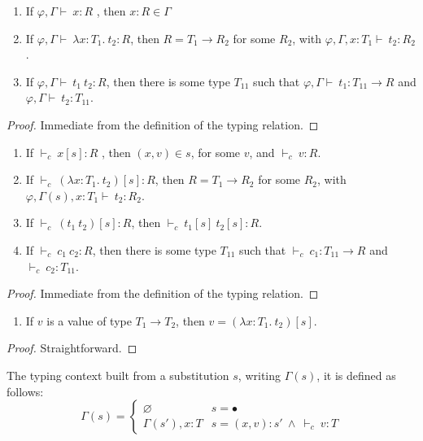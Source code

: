 \documentclass[preprint,authoryear,sort&compress,9pt,nocopyrightspace]{article}
\newcommand{\conf}[2][s]{(#2)[#1]}
\newcommand{\env}{{\emt,\Gamma \vdash \ }}
\newcommand{\envE}{{\emt, \Gamma , x:T_1 \vdash \ }}
\newcommand{\envEC}{{\emt, \Gamma(s) , x:T_1 \vdash \ }}
\newcommand{\tyC}{{\vdash_c \ }}
\newcommand{\absD}{\lambda x:T_1. \ t_2}
\newcommand{\emt}{\varphi}
\begin{document}
\begin{lemma}
\label{lemma:itt}
\mbox{}
\begin{enumerate}
\item If $\env x : R$ , then $x : R \in \Gamma$
\item If $\env \absD : R$, then $R = T_1 \to R_2$ for some $R_2$, with $\envE t_2 : R_2$.
\item If $\env t_1 \ t_2 : R$, then there is some type $T_{11}$ such that $\env t_1 : T_{11} \to R$ and $\env t_2 : T_{11}$.
\end{enumerate}
\end{lemma}
\begin{proof}
Immediate from the definition of the typing relation.
\end{proof}

\begin{lemma} 
\label{lemma:ict}
\mbox{}
\begin{enumerate}
\item If $\tyC x[s] : R$ , then $(x,v) \in s$, for some $v$, and $\tyC v:R$.
\item If $\tyC \conf{\absD}: R$, then $R = T_1 \to R_2$ for some $R_2$, with $\envEC t_2 : R_2$.
\item If $\tyC  \conf{t_1 \ t_2} : R$, then $\tyC  t_1 [s] \ t_2 [s]:R$.
\item If $\tyC   c_1 \ c_2 : R$, then there is some type $T_{11}$ such that $\tyC c_1 : T_{11} \to R$ and $\tyC c_2: T_{11}$.
\end{enumerate}
\end{lemma}

\begin{proof}Immediate from the definition of the typing relation.
\end{proof}

\begin{lemma} 
\label{lemma:cf}
\mbox{}
\begin{enumerate}
\item If $v$ is a value of type $T_1 \to T_2$, then $v = \conf{\absD}$.
\end{enumerate}
\end{lemma}

\begin{proof} Straightforward.
\end{proof}

\begin{definition}[$\Gamma(s)$]
\label{definition:tcs}
\mbox{}
The typing context built from a substitution $s$, writing $\Gamma(s)$, it is defined as follows:
\[ \Gamma(s) = \begin{cases} 
     \varnothing & s =  \bullet \\
      \Gamma(s'), x:T & s = (x,v):s' \ \land \ \tyC v : T 
   \end{cases}
\]
\end{definition}
\end{document}
